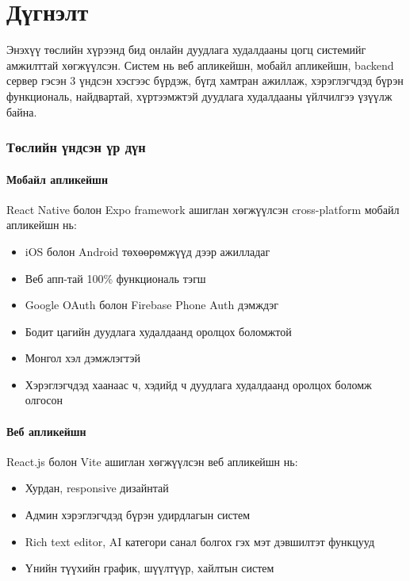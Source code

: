 \chapter{Дүгнэлт}
\label{Conclusion}
\newpage

Энэхүү төслийн хүрээнд бид онлайн дуудлага худалдааны цогц системийг амжилттай хөгжүүлсэн. Систем нь веб апликейшн, мобайл апликейшн, backend сервер гэсэн 3 үндсэн хэсгээс бүрдэж, бүгд хамтран ажиллаж, хэрэглэгчдэд бүрэн функциональ, найдвартай, хүртээмжтэй дуудлага худалдааны үйлчилгээ үзүүлж байна.

\subsection{Төслийн үндсэн үр дүн}

\subsubsection{Мобайл апликейшн}
React Native болон Expo framework ашиглан хөгжүүлсэн cross-platform мобайл апликейшн нь:
\begin{itemize}
    \item iOS болон Android төхөөрөмжүүд дээр ажилладаг
    \item Веб апп-тай 100\% функциональ тэгш
    \item Google OAuth болон Firebase Phone Auth дэмждэг
    \item Бодит цагийн дуудлага худалдаанд оролцох боломжтой
    \item Монгол хэл дэмжлэгтэй
    \item Хэрэглэгчдэд хаанаас ч, хэдийд ч дуудлага худалдаанд оролцох боломж олгосон
\end{itemize}

\subsubsection{Веб апликейшн}
React.js болон Vite ашиглан хөгжүүлсэн веб апликейшн нь:
\begin{itemize}
    \item Хурдан, responsive дизайнтай
    \item Админ хэрэглэгчдэд бүрэн удирдлагын систем
    \item Rich text editor, AI категори санал болгох гэх мэт дэвшилтэт функцууд
    \item Үнийн түүхийн график, шүүлтүүр, хайлтын систем
\end{itemize}

